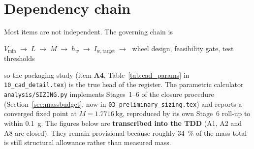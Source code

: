 \documentclass[11pt,a4paper]{article}
\begin{document}
\section{Dependency chain}
\label{sec:chain}

Most items are not independent. The governing chain is

\begin{center}
$V_{\min} \;\rightarrow\; L \;\rightarrow\; M \;\rightarrow\; h_w \;\rightarrow\;
I_{w,\text{target}} \;\rightarrow\;$ wheel design, feasibility gate, test thresholds
\end{center}

so the packaging study (item \textbf{A4}, Table~\ref{tab:cad_params} in
\texttt{10\_cad\_detail.tex}) is the true head of the register. The
parametric calculator \texttt{analysis/SIZING.py} implements Stages~1--6 of the
closure procedure (Section~\ref{sec:massbudget}, now in
\texttt{03\_preliminary\_sizing.tex}) and reports a converged fixed point at
$M = \qty{1.7716}{\kilo\gram}$, reproduced by its own Stage~6 roll-up to within
\qty{0.1}{\gram}. The figures below are \textbf{transcribed into the TDD}
(A1, A2 and A8 are closed). They remain provisional because roughly
\qty{34}{\percent} of the mass total is still structural allowance rather than
measured mass.
\end{document}
